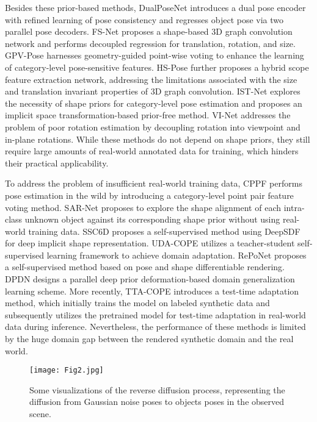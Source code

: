 \par Besides these prior-based methods, DualPoseNet\cite{27} introduces a dual pose encoder with refined learning of pose consistency and regresses object pose via two parallel pose decoders. FS-Net\cite{28} proposes a shape-based 3D graph convolution network and performs decoupled regression for translation, rotation, and size. GPV-Pose\cite{29} harnesses geometry-guided point-wise voting to enhance the learning of category-level pose-sensitive features. HS-Pose\cite{30} further proposes a hybrid scope feature extraction network, addressing the limitations associated with the size and translation invariant properties of 3D graph convolution. IST-Net\cite{31} explores the necessity of shape priors for category-level pose estimation and proposes an implicit space transformation-based prior-free method. VI-Net\cite{32} addresses the problem of poor rotation estimation by decoupling rotation into viewpoint and in-plane rotations. While these methods do not depend on shape priors, they still require large amounts of real-world annotated data for training, which hinders their practical applicability.

\par To address the problem of insufficient real-world training data, CPPF\cite{33} performs pose estimation in the wild by introducing a category-level point pair feature voting method. SAR-Net\cite{34} proposes to explore the shape alignment of each intra-class unknown object against its corresponding shape prior without using real-world training data. SSC6D\cite{35} proposes a self-supervised method using DeepSDF\cite{36} for deep implicit shape representation. UDA-COPE\cite{37} utilizes a teacher-student self-supervised learning framework to achieve domain adaptation. RePoNet\cite{38} proposes a self-supervised method based on pose and shape differentiable rendering. DPDN\cite{39} designs a parallel deep prior deformation-based domain generalization learning scheme. More recently, TTA-COPE\cite{40} introduces a test-time adaptation method, which initially trains the model on labeled synthetic data and subsequently utilizes the pretrained model for test-time adaptation in real-world data during inference. Nevertheless, the performance of these methods is limited by the huge domain gap between the rendered synthetic domain and the real world.

\begin{figure*}[htbp]
\centering
\texttt{[image: Fig2.jpg]}
\vspace{-2em}
\caption{Some visualizations of the reverse diffusion process, representing the diffusion from Gaussian noise poses to objects poses in the observed scene.}
\label{Fig2}
\vspace{-1em}
\end{figure*}

